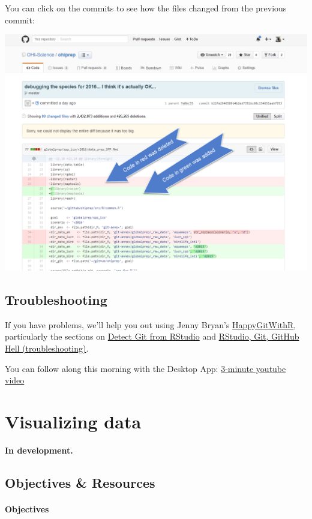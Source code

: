 \documentclass[]{book}
\theoremstyle{definition}
\theoremstyle{definition}
\theoremstyle{definition}
\theoremstyle{remark}
\begin{document}
You can click on the commits to see how the files changed from the
previous commit:

\includegraphics{img/commit_compare_3.png}

\section{Troubleshooting}\label{troubleshooting-1}

If you have problems, we'll help you out using Jenny Bryan's
\href{http://happygitwithr.com}{HappyGitWithR}, particularly the
sections on \href{http://happygitwithr.com/rstudio-see-git.html}{Detect
Git from RStudio} and
\href{http://happygitwithr.com/troubleshooting.html}{RStudio, Git,
GitHub Hell (troubleshooting)}.

You can follow along this morning with the Desktop App:
\href{https://www.youtube.com/watch?v=XdhuWDdu-rk}{3-minute youtube
video}

\chapter{Visualizing data}\label{viz}

\textbf{In development.}

\section{Objectives \& Resources}\label{objectives-resources-2}

\subsubsection{Objectives}\label{objectives-1}
\end{document}
